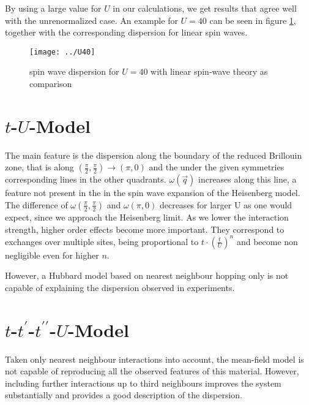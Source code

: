 \documentclass[a4paper,12pt]{report}
\begin{document}
By using a large value for $U$ in our calculations, we get results that agree well with the unrenormalized case.
An example for $U=40$ can be seen in figure \ref{largeU}, together with the corresponding dispersion for linear spin waves.
%
\begin{figure}
 \label{largeU}
 \begin{center}
  \texttt{[image: ../U40]}
  \caption{spin wave dispersion for $U=40$ with linear spin-wave theory as comparison}
 \end{center}
\end{figure}
%
  

\section{$t$-$U$-Model}



The main feature is the dispersion along the boundary of the reduced Brillouin zone,
that is along $(\frac{\pi}2,\frac{\pi}2) \rightarrow (\pi,0)$ and the under the given symmetries corresponding lines in the other quadrants.
$\omega(\vec q)$ increases along this line, a feature not present in the in the spin wave expansion of the Heisenberg model.
The difference of $\omega(\frac{\pi}2,\frac{\pi}2)$ and $\omega(\pi,0)$ decreases for larger U as one would expect, since we approach the Heisenberg limit.
As we lower the interaction strength, higher order effects become more important.
They correspond to exchanges over multiple sites, being proportional to $t\cdot(\frac tU)^n$ and become non negligible even for higher $n$.


However, a Hubbard model based on nearest neighbour hopping only is not capable of explaining the dispersion observed in experiments.





\section{$t$-$t^{\prime}$-$t^{\prime \prime}$-$U$-Model}


Taken only nearest neighbour interactions into account, the mean-field model is not capable of reproducing all the observed features of this material.
However, including further interactions up to third neighbours improves the system substantially and provides a good description of the dispersion.
\end{document}
